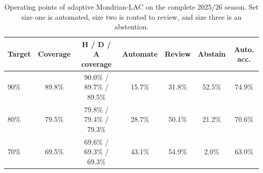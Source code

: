 \begin{table}[tbp]
\centering
\footnotesize
\setlength{\tabcolsep}{5pt}
\caption{Operating points of adaptive Mondrian-LAC on the complete 2025/26 season. Set size one is automated, size two is routed to review, and size three is an abstention.}
\label{tab:operating}
\begin{tabular}{lcccccc}
\toprule
Target & Coverage & H / D / A coverage & Automate & Review & Abstain & Auto. acc. \\
\midrule
90\% & 89.8\% & 90.0\% / 89.7\% / 89.5\% & 15.7\% & 31.8\% & 52.5\% & 74.9\% \\
80\% & 79.5\% & 79.8\% / 79.4\% / 79.3\% & 28.7\% & 50.1\% & 21.2\% & 70.6\% \\
70\% & 69.5\% & 69.6\% / 69.3\% / 69.3\% & 43.1\% & 54.9\% & 2.0\% & 63.0\% \\
\bottomrule
\end{tabular}
\end{table}
